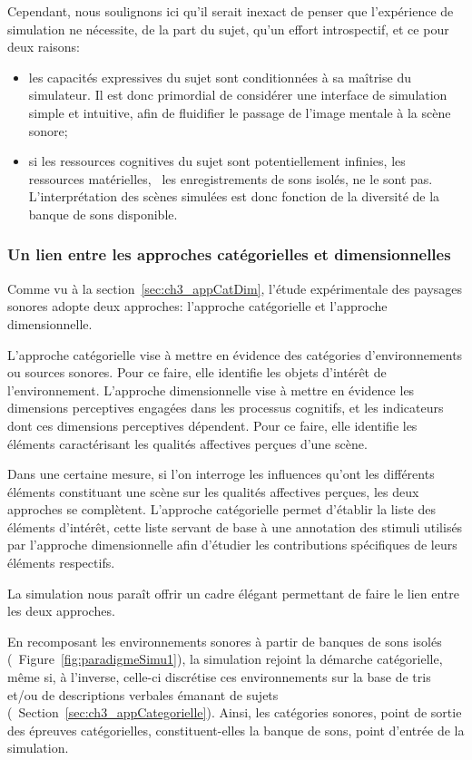 Cependant, nous soulignons ici qu'il serait inexact de penser que l'expérience de simulation ne nécessite, de la part du sujet, qu'un effort introspectif, et ce pour deux raisons:

\begin{itemize}
\item les capacités expressives du sujet sont conditionnées à sa maîtrise du simulateur. Il est donc primordial de considérer une interface de simulation simple et intuitive, afin de fluidifier le passage de l'image mentale à la scène sonore;
\item si les ressources cognitives du sujet sont potentiellement infinies, les ressources matérielles, \ie~les enregistrements de sons isolés, ne le sont pas. L'interprétation des scènes simulées est donc fonction de la diversité de la banque de sons disponible. 
\end{itemize}

\subsubsection{Un lien entre les approches catégorielles et dimensionnelles}

Comme vu à la section~\ref{sec:ch3_appCatDim}, l'étude expérimentale des paysages sonores adopte deux approches: l'approche catégorielle et l'approche dimensionnelle.

L'approche catégorielle vise à mettre en évidence des catégories d'environnements ou sources sonores. Pour ce faire, elle identifie les objets d'intérêt de l'environnement. L'approche dimensionnelle vise à mettre en évidence les dimensions perceptives engagées dans les processus cognitifs, et les indicateurs dont ces dimensions perceptives dépendent. Pour ce faire, elle identifie les éléments caractérisant les qualités affectives perçues d'une scène.

Dans une certaine mesure, si l'on interroge les influences qu'ont les différents éléments constituant une scène sur les qualités affectives perçues, les deux approches se complètent. L'approche catégorielle permet d'établir la liste des éléments d'intérêt, cette liste servant de base à une annotation des stimuli utilisés par l'approche dimensionnelle afin d'étudier les contributions spécifiques de leurs éléments respectifs.

La simulation nous paraît offrir un cadre élégant permettant de faire le lien entre les deux approches.

En recomposant les environnements sonores à partir de banques de sons isolés (\cf~Figure~\ref{fig:paradigmeSimu1}), la simulation rejoint la démarche catégorielle, même si, à l'inverse, celle-ci discrétise ces environnements sur la base de tris et/ou de descriptions verbales émanant de sujets (\cf~Section~\ref{sec:ch3_appCategorielle}). Ainsi, les catégories sonores, point de sortie des épreuves catégorielles, constituent-elles la banque de sons, point d'entrée de la simulation.

